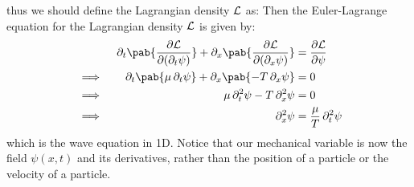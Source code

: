 thus we should define the Lagrangian density $\mathcal{L}$ as:
Then the Euler-Lagrange equation for the Lagrangian density $\mathcal{L}$ is given by:
\begin{alignat}{2}
   &          & \pdif{t} \pab{\pdv{\lagr}{(\pdif{t} \psi)}} + \pdif{x} \pab{\pdv{\lagr}{(\pdif{x} \psi)}} & = \pdv{\lagr}{\psi}              \\
   & \implies & \quad \pdif{t} \pab{\mu \pdif{t} \psi} + \pdif{x} \pab{- T \pdif{x} \psi}                 & = 0                              \\
   & \implies & \quad \mu \pdif[2]{t} \psi - T \pdif[2]{x} \psi                                           & = 0                              \\
   & \implies & \quad \pdif[2]{x} \psi                                                                    & = \frac{\mu}{T} \pdif[2]{t} \psi
\end{alignat}
which is the wave equation in 1D.
Notice that our mechanical variable is now the field $\psi (x, t)$ and its derivatives, rather than the position of a particle or the velocity of a particle.

